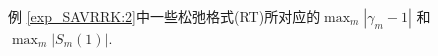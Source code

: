 \documentclass[aspectratio=169]{beamer}
\numberwithin{theorem}{section} %
\begin{document}
\begin{frame}%
	\begin{figure}[H]
		\begin{center}
		\caption{例 \ref{exp_SAVRRK:2}中一些松弛格式(RT)所对应的$\max_m\left|\gamma_m-1\right|$ 和 $\max_m\left|S_m(1)\right|$.}
		\label{fig_SAVRRK:2-1}
		\end{center}
		\end{figure}
\end{frame}
\end{document}
